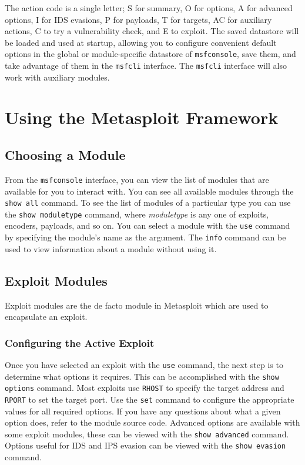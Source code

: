 \documentclass{report}
\begin{document}
\par
The action code is a single letter; S for summary, O for options, A for advanced
options, I for IDS evasions, P for payloads, T for targets, AC for auxiliary
actions, C to try a vulnerability check, and E to exploit. The saved datastore
will be loaded and used at startup, allowing you to configure convenient default
options in the global or module-specific datastore of \texttt{msfconsole}, save
them, and take advantage of them in the \texttt{msfcli} interface. The
\texttt{msfcli} interface will also work with auxiliary modules.

\pagebreak

\chapter{Using the Metasploit Framework}

	\section{Choosing a Module}

\par
From the \texttt{msfconsole} interface, you can view the list of modules that
are available for you to interact with. You can see all available modules
through the \texttt{show all} command. To see the list of modules of a
particular type you can use the \texttt{show moduletype} command, where
\textit{moduletype} is any one of exploits, encoders, payloads, and so on. You
can select a module with the \texttt{use} command by specifying the module's
name as the argument. The \texttt{info} command can be used to view information
about a module without using it.

	\section{Exploit Modules}

\par
Exploit modules are the de facto module in Metasploit which are used to
encapsulate an exploit.

		\subsection{Configuring the Active Exploit}

\par
Once you have selected an exploit with the \texttt{use} command, the next step
is to determine what options it requires. This can be accomplished with the
\texttt{show options} command. Most exploits use \texttt{RHOST} to specify the
target address and \texttt{RPORT} to set the target port. Use the \texttt{set}
command to configure the appropriate values for all required options. If you
have any questions about what a given option does, refer to the module source
code. Advanced options are available with some exploit modules, these can be
viewed with the \texttt{show advanced} command. Options useful for IDS and IPS
evasion can be viewed with the \texttt{show evasion} command.
\end{document}
